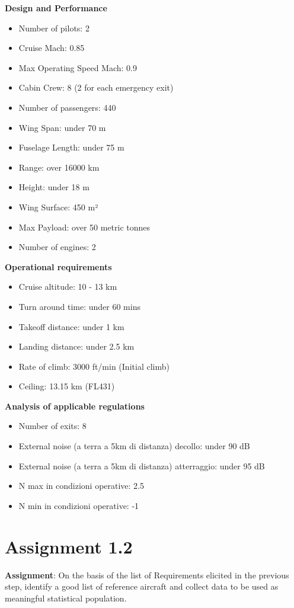 \documentclass{article}
\begin{document}
\textbf{Design and Performance\label{Design_and_performance}}
\begin{itemize}
    \item Number of pilots: 2
    \item Cruise Mach: 0.85
    \item Max Operating Speed Mach: 0.9
    \item Cabin Crew: 8 (2 for each emergency exit)
    \item Number of passengers: 440
    \item Wing Span: under 70 m
    \item Fuselage Length: under 75 m
    \item Range: over 16000 km
    \item Height: under 18 m
    \item Wing Surface: 450 m²
    \item Max Payload: over 50 metric tonnes
    \item Number of engines: 2
\end{itemize}
\pagebreak
\textbf{Operational requirements\label{Operational_requirements}}
\begin{itemize}
    \item Cruise altitude: 10 - 13 km
    \item Turn around time: under 60 mins
    \item Takeoff distance: under 1 km
    \item Landing distance: under 2.5 km
    \item Rate of climb: 3000 ft/min (Initial climb)
    \item Ceiling: 13.15 km (FL431)
\end{itemize}

\textbf{Analysis of applicable regulations\label{Analysis_applicable_regulations}}
\begin{itemize}
    \item Number of exits: 8
    \item External noise (a terra a 5km di distanza) decollo: under 90 dB
    \item External noise (a terra a 5km di distanza) atterraggio: under 95 dB
    \item N max in condizioni operative: 2.5
    \item N min in condizioni operative: -1
\end{itemize}
\pagebreak
\section{Assignment 1.2\label{Assignment_1.2}}
\textbf{Assignment}: On the basis of the list of Requirements elicited
in the previous step, identify a good list of reference aircraft and
collect data to be used as meaningful statistical population.\newline
\end{document}
